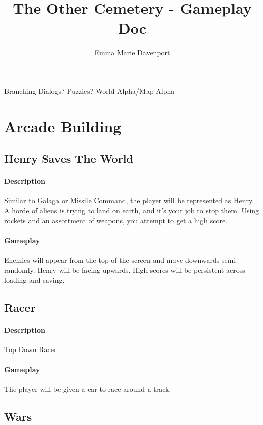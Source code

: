 \documentclass[12pt, a4paper, titlepage]{article}
\author{Emma Marie Davenport}
\title{The Other Cemetery - Gameplay Doc}
\begin{document}
    \maketitle
    
    Branching Dialogs? Puzzles? World Alpha/Map Alpha
    
    \section{Arcade Building}
    \subsection{Henry Saves The World}
    
    	\paragraph{Description} Similar to Galaga or Missile Command, the player will be represented as Henry. A horde of aliens is trying to land on earth, and it's your job to stop them. Using rockets and an assortment of weapons, you attempt to get a high score.
    
    	\paragraph{Gameplay} Enemies will appear from the top of the screen and move downwards semi randomly. Henry will be facing upwards. High scores will be persistent across loading
    and saving.
    
    \subsection{Racer}
    
    	\paragraph{Description} Top Down Racer
	
	\paragraph{Gameplay} The player will be given a car to race around a track.
	
   \subsection{Wars}
   	
\end{document}
